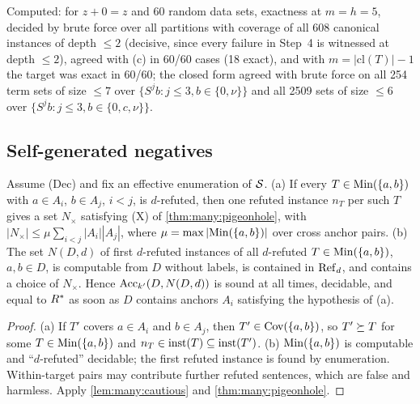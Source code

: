 Computed: for $z+0=z$ and 60 random data sets, exactness at $m=h=5$, decided by brute force over all
partitions with coverage of all 608 canonical instances of depth $\le2$ (decisive, since every failure in Step~4 is
witnessed at depth $\le2$), agreed with (c) in 60/60 cases (18 exact), and with $m=|\mathrm{cl}(T)|-1$ the target was exact in
60/60; the closed form agreed with brute force on all 254 term sets of size $\le7$ over $\{S^jb:j\le3,b\in\{0,\nu\}\}$ and
all 2509 sets of size $\le6$ over $\{S^jb:j\le3,b\in\{0,c,\nu\}\}$.

\subsection{Self-generated negatives}\label{app:many:pigeon}

\begin{corollary}\label{cor:many:selfneg}
Assume (Dec) and fix an effective enumeration of $\mathcal{S}$.
(a) If every $T\in\mathrm{Min}(\{a,b\})$ with $a\in A_i$, $b\in A_j$, $i<j$, is $d$-refuted, then one refuted instance $n_T$ per such
$T$ gives a set $N_\times$ satisfying (X) of \cref{thm:many:pigeonhole}, with $|N_\times|\le\mu\sum_{i<j}|A_i||A_j|$, where
$\mu=\max|\mathrm{Min}(\{a,b\})|$ over cross anchor pairs.
(b) The set $N(D,d)$ of first $d$-refuted instances of all $d$-refuted $T\in\mathrm{Min}(\{a,b\})$, $a,b\in D$, is computable from
$D$ without labels, is contained in $\mathrm{Ref}_d$, and contains a choice of $N_\times$. Hence $\mathrm{Acc}_{k'}(D,N(D,d))$ is sound at
all times, decidable, and equal to $R^{*}$ as soon as $D$ contains anchors $A_i$ satisfying the hypothesis of (a).
\end{corollary}
\begin{proof}
(a) If $T'$ covers $a\in A_i$ and $b\in A_j$, then $T'\in\mathrm{Cov}(\{a,b\})$, so $T'\succeq T$ for some $T\in\mathrm{Min}(\{a,b\})$ and
$n_T\in\mathrm{inst}(T)\subseteq\mathrm{inst}(T')$. (b) $\mathrm{Min}(\{a,b\})$ is computable and ``$d$-refuted'' decidable; the first refuted
instance is found by enumeration. Within-target pairs may contribute further refuted sentences, which are false and
harmless. Apply \cref{lem:many:cautious} and \cref{thm:many:pigeonhole}.
\end{proof}


